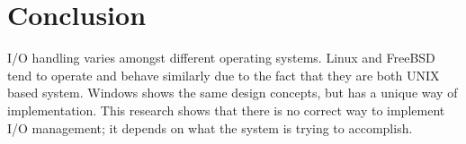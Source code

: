 \documentclass[10pt, onecolumn]{IEEEtran}
\begin{document}
    \section{Conclusion}        
        I/O handling varies amongst different operating systems. Linux and FreeBSD tend to operate and behave similarly due to the fact that they are both UNIX based system. Windows shows the same design concepts, but has a unique way of implementation. This research shows that there is no correct way to implement I/O management; it depends on what the system is trying to accomplish.
        
    \newpage
        
    
    
\end{document}

